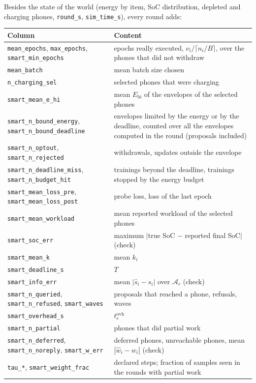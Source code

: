\documentclass[11pt,a4paper]{article}
\newcommand{\cf}[1]{\texttt{#1}}
\begin{document}
Besides the state of the world (energy by item, SoC distribution, depleted and
charging phones, \cf{round\_s}, \cf{sim\_time\_s}), every round adds:
\begin{longtable}{p{}p{}}
\toprule
Column & Content \\
\midrule
\endhead
\cf{mean\_epochs}, \cf{max\_epochs}, \cf{smart\_min\_epochs} & epochs really executed, $\nu_i / \lceil n_i/B \rceil$, over the phones that did not withdraw \\
\cf{mean\_batch} & mean batch size chosen \\
\cf{n\_charging\_sel} & selected phones that were charging \\
\cf{smart\_mean\_e\_hi} & mean $E_{\mathrm{hi}}$ of the envelopes of the selected phones \\
\cf{smart\_n\_bound\_energy}, \cf{smart\_n\_bound\_deadline} & envelopes limited by the energy or by the deadline, counted over all the envelopes computed in the round (proposals included) \\
\cf{smart\_n\_optout}, \cf{smart\_n\_rejected} & withdrawals, updates outside the envelope \\
\cf{smart\_n\_deadline\_miss}, \cf{smart\_n\_budget\_hit} & trainings beyond the deadline, trainings stopped by the energy budget \\
\cf{smart\_mean\_loss\_pre}, \cf{smart\_mean\_loss\_post} & probe loss, loss of the last epoch \\
\cf{smart\_mean\_workload} & mean reported workload of the selected phones \\
\cf{smart\_soc\_err} & maximum $|$true SoC $-$ reported final SoC$|$ (check) \\
\cf{smart\_mean\_k} & mean $k_i$ \\
\cf{smart\_deadline\_s} & $T$ \\
\cf{smart\_info\_err} & mean $|\hat{s}_i - s_i|$ over $\mathcal{A}_r$ (check) \\
\cf{smart\_n\_queried}, \cf{smart\_n\_refused}, \cf{smart\_waves} & proposals that reached a phone, refusals, waves \\
\cf{smart\_overhead\_s} & $t^{\mathrm{ovh}}_r$ \\
\cf{smart\_n\_partial} & phones that did partial work \\
\cf{smart\_n\_deferred}, \cf{smart\_n\_noreply}, \cf{smart\_w\_err} & deferred phones, unreachable phones, mean $|\hat{w}_i - w_i|$ (check) \\
\cf{tau\_*}, \cf{smart\_weight\_frac} & declared steps; fraction of samples seen in the rounds with partial work \\
\bottomrule
\end{longtable}
\end{document}
